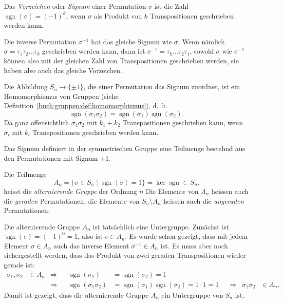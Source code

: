 \begin{definition}
%
%
Das {\em Vorzeichen} oder {\em Signum} einer Permutation $\sigma$ ist
die Zahl $\operatorname{sgn}(\sigma)=(-1)^k$, wenn $\sigma$ als Produkt
von $k$ Transpositionen geschrieben werden kann.
\end{definition}

Die inverse Permutation $\sigma^{-1}$ hat das gleiche Signum wie $\sigma$.
Wenn nämlich $\sigma= \tau_1\tau_2\dots\tau_k$ geschrieben werden kann,
dann ist $\sigma^{-1}=\tau_k\dots\tau_2\tau_1$, sowohl $\sigma$ wie
$\sigma^{-1}$ können also mit der gleichen Zahl von Transpositionen
geschrieben werden, sie haben also auch das gleiche Vorzeichen.

Die Abbildung $S_n\to\{\pm1\}$, die einer Permutation das Signum zuordnet,
ist ein Homomorphismus von Gruppen
(siehe Definition~\ref{buch:gruppen:def:homomorphismus}),
%
d.~h.
\[
\operatorname{sgn}(\sigma_1\sigma_2)
=
\operatorname{sgn}(\sigma_1)
\operatorname{sgn}(\sigma_2).
\]
Da ganz offensichtlich $\sigma_1\sigma_2$ mit $k_1+k_2$ Transpositionen
geschrieben kann, wenn $\sigma_i$ mit $k_i$ Transpositionen geschrieben
werden kann.

Das Signum definiert in der symmetrischen Gruppe eine Teilmenge bestehnd
aus den Permutationen mit Signum $+1$.

\begin{definition}
Die Teilmenge
\[
A_n
=
\{
\sigma\in S_n\;|\; \operatorname{sgn}(\sigma)=1
\}
=
\ker \operatorname{sgn}
\subset
S_n.
\]
%
%
heisst die {\em alternierende Gruppe} der Ordnung $n$
Die Elemente von $A_n$ heissen auch die {\em geraden} Permutationen,
%
%
die
Elemente von $S_n\setminus A_n$ heissen auch die {\em ungeraden}
Permutationen.
\end{definition}

Die alternierende Gruppe $A_n$ ist tatsächlich eine Untergruppe.
%
Zunächst ist $\operatorname{sgn}(e)=(-1)^0=1$, also ist $e\in A_n$.
Es wurde schon gezeigt, dass mit jedem Element $\sigma\in A_n$ auch
das inverse Element $\sigma^{-1}\in A_n$ ist.
Es muss aber noch sichergestellt werden, dass das Produkt von zwei
geraden Transpositionen wieder gerade ist:
\[
\begin{aligned}
\sigma_1,\sigma_2&\in A_n
&\Rightarrow&&
\operatorname{sgn}(\sigma_1)
&=
\operatorname{sgn}(\sigma_2)
=
1
\\
&&\Rightarrow&&
\operatorname{sgn}(\sigma_1\sigma_2)
&=
\operatorname{sgn}(\sigma_1)
\operatorname{sgn}(\sigma_2)
=
1\cdot 1=1
&&\Rightarrow&
\sigma_1\sigma_2&\in A_n.
\end{aligned}
\]
Damit ist gezeigt, dass die alternierende Gruppe $A_n$ ein Untergruppe von 
$S_n$ ist.

